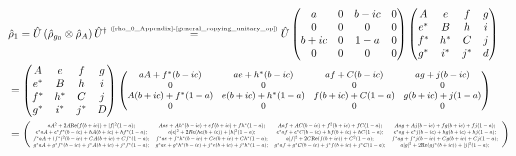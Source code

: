 \documentclass[11pt]{article}
\numberwithin{equation}{section} %
\numberwithin{figure}{section} %
\newcommand\numeq[1] %
  {\stackrel{\scriptscriptstyle(\mkern-1.5mu#1\mkern-1.5mu)}{=}}
\begin{document}
\begin{appendices}
\newenvironment{mpmatrix}{\begin{medsize}\begin{pmatrix}}%
{\end{pmatrix}\end{medsize}}%
\begin{equation} \label{hypothesis_U}
\begin{split}
&\hat{\rho}_{1}=\hat{U}\,(\hat{\rho}_{g_0}\otimes\hat{\rho}_A)\,\hat{U}^\dagger\numeq{\textrm{\ref{rho_0_Appendix}-\ref{general_copying_unitary_op}}} \hat{U}\begin{pmatrix}a&0&b-ic&0\\0&0&0&0\\b+ic&0&1-a&0\\0&0&0&0\end{pmatrix}  \begin{pmatrix} A&e&f&g\\ e^*&B&h&i\\ f^*&h^*&C&j\\ g^*&i^*&j^*&d\end{pmatrix}\\
&=\begin{pmatrix}
      A&e&f&g\\
       e^*&B&h&i\\
        f^*&h^*&C&j\\
         g^*&i^*&j^*&D
  \end{pmatrix} \begin{mpmatrix} aA+f^*(b-ic)&ae+h^*(b-ic)&af+C(b-ic)&ag+j(b-ic)\\ 0&0&0&0\\ A(b+ic)+f^*(1-a)&e(b+ic)+h^*(1-a)&f(b+ic)+C(1-a)&g(b+ic)+j(1-a)\\ 0&0&0&0\end{mpmatrix}\\
&= \left(
    \scalemath{0.5}{
    \begin{array}{cccc}
     aA^2+2A\textrm{Re}(f(b+ic))+|f|^2(1-a)\textrm{;}\,&Aae+Ah^*(b-ic)+ef(b+ic)+fh^*(1-a)\textrm{;}\,&Aaf+AC(b-ic)+f^2(b+ic)+fC(1-a)\textrm{;}\,&Aag+Aj(b-ic)+fg(b+ic)+fj(1-a)\textrm{;}\,\\
      e^*aA+e^*f^*(b-ic)+hA(b+ic)+hf^*(1-a)\textrm{;}\,&a|e|^2+2Re(he(b+ic))+|h|^2(1-a)\textrm{;}\,&e^*af+e^*C(b-ic)+hf(b+ic)+hC(1-a)\textrm{;}\,&e^*ag+e^*j(b-ic)+hg(b+ic)+hj(1-a)\textrm{;}\,\\
      f^*aA+(f^*)^2(b-ic)+CA(b+ic)+Cf^*(1-a)\textrm{;}\,&f^*ae+f^*h^*(b-ic)+Ce(b+ic)+Ch^*(1-a)\textrm{;}\,&a|f|^2+2C\textrm{Re}(f(b+ic))+C^2(1-a)\textrm{;}\,&f^*ag+f^*j(b-ic)+Cg(b+ic)+Cj(1-a)\textrm{;}\,\\
        g^*aA+g^*f^*(b-ic)+j^*A(b+ic)+j^*f^*(1-a)\textrm{;}\,&g^*ae+g^*h^*(b-ic)+j^*e(b+ic)+j^*h^*(1-a)\textrm{;}\,&g^*af+g^*C(b-ic)+j^*f(b+ic)+j^*C(1-a)\textrm{;}\,&a|g|^2+2\textrm{Re}(gj^*(b+ic))+|j|^2(1-a)\textrm{;}\,
     \end{array}
    }
  \right)\\
\end{split}
\end{equation}\\


\end{appendices}
\end{document}
